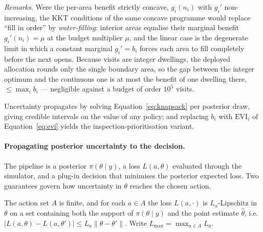 \noindent\emph{Remarks.} Were the per-area benefit strictly concave, $g_i(n_i)$
with $g_i'$ non-increasing, the KKT conditions of the same concave programme would
replace ``fill in order'' by \emph{water-filling}: interior areas equalise their
marginal benefit $g_i'(n_i) = \mu$ at the budget multiplier $\mu$, and the linear
case is the degenerate limit in which a constant marginal $g_i' = b_i$ forces each
area to fill completely before the next opens. Because visits are integer
dwellings, the deployed allocation rounds only the single boundary area, so the
gap between the integer optimum and the continuous one is at most the benefit of
one dwelling there, $\le \max_i b_i$ --- negligible against a budget of order
$10^5$ visits.

Uncertainty propagates by solving Equation~\eqref{eq:knapsack} per posterior draw,
giving credible intervals on the value of any policy; and replacing $b_i$ with
$\mathrm{EVI}_i$ of Equation~\eqref{eq:evi} yields the inspection-prioritisation
variant.

\paragraph{Propagating posterior uncertainty to the decision.} The pipeline is a
posterior $\pi(\theta \mid y)$, a loss $L(a,\theta)$ evaluated through the
simulator, and a plug-in decision that minimises the posterior expected loss. Two
guarantees govern how uncertainty in $\theta$ reaches the chosen action.

\begin{assumption}
\label{ass:lipschitz}
The action set $A$ is finite, and for each $a \in A$ the loss $L(a,\cdot)$ is
$L_a$-Lipschitz in $\theta$ on a set containing both the support of
$\pi(\theta \mid y)$ and the point estimate $\hat\theta$, i.e.\
$|L(a,\theta) - L(a,\theta')| \le L_a \|\theta - \theta'\|$. Write
$L_{\max} = \max_{a \in A} L_a$.
\end{assumption}

